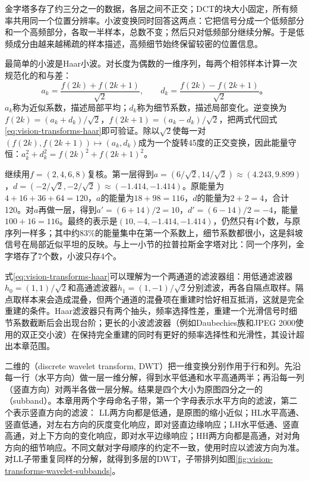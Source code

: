 金字塔多存了约三分之一的数据，各层之间不正交；DCT的块大小固定，所有频率共用同一个位置分辨率。小波变换同时回答这两点：它把信号分成一个低频部分和一个高频部分，各取一半样本，总数不变；然后只对低频部分继续分解。于是低频成分由越来越稀疏的样本描述，高频细节始终保留较密的位置信息。

最简单的小波是Haar小波。对长度为偶数的一维序列，每两个相邻样本计算一次规范化的和与差：
\begin{equation}
  a_k=\frac{f(2k)+f(2k+1)}{\sqrt2},\qquad
  d_k=\frac{f(2k)-f(2k+1)}{\sqrt2}\text{。}
  \label{eq:vision-transforms-haar}
\end{equation}
$a_k$称为近似系数，描述局部平均；$d_k$称为细节系数，描述局部变化。逆变换为$f(2k)=(a_k+d_k)/\sqrt2$，$f(2k+1)=(a_k-d_k)/\sqrt2$，把两式代回式\eqref{eq:vision-transforms-haar}即可验证。除以$\sqrt2$使每一对$(f(2k),f(2k+1))\mapsto(a_k,d_k)$成为一个旋转45度的正交变换，因此能量守恒：$a_k^2+d_k^2=f(2k)^2+f(2k+1)^2$。

继续用$f=(2,4,6,8)$复核。第一层得到$a=(6/\sqrt2,14/\sqrt2)\approx(4.243,9.899)$，$d=(-2/\sqrt2,-2/\sqrt2)\approx(-1.414,-1.414)$。原能量为$4+16+36+64=120$，$a$的能量为$18+98=116$，$d$的能量为$2+2=4$，合计120。对$a$再做一层，得到$a'=(6+14)/2=10$，$d'=(6-14)/2=-4$，能量$100+16=116$。最终的表示是$(10,-4,-1.414,-1.414)$，仍然只有4个数，与原序列一样多；其中约83\%的能量集中在第一个系数上，细节系数都很小，这是斜坡信号在局部近似平坦的反映。与上一小节的拉普拉斯金字塔对比：同一个序列，金字塔存了7个数，小波只存4个。

式\eqref{eq:vision-transforms-haar}可以理解为一个两通道的滤波器组：用低通滤波器$h_0=(1,1)/\sqrt2$和高通滤波器$h_1=(1,-1)/\sqrt2$分别滤波，再各自隔点取样。隔点取样本来会造成混叠，但两个通道的混叠项在重建时恰好相互抵消，这就是完全重建的条件。Haar滤波器只有两个抽头，频率选择性差，重建一个光滑信号时细节系数截断后会出现台阶；更长的小波滤波器（例如Daubechies族和JPEG 2000使用的双正交小波）在保持完全重建的同时有更好的频率选择性和光滑性，其设计超出本章范围。

二维的（discrete wavelet transform, DWT）把一维变换分别作用于行和列。先沿每一行（水平方向）做一层一维分解，得到水平低通和水平高通两半；再沿每一列（竖直方向）对两半各做一层分解。结果是四个大小为原图四分之一的（subband）。本章用两个字母命名子带，第一个字母表示水平方向的滤波，第二个表示竖直方向的滤波：
LL两方向都是低通，是原图的缩小近似；HL水平高通、竖直低通，对左右方向的灰度变化响应，即对竖直边缘响应；LH水平低通、竖直高通，对上下方向的变化响应，即对水平边缘响应；HH两方向都是高通，对对角方向的细节响应。不同文献对字母顺序的约定不一致，使用时应以滤波方向为准。对LL子带重复同样的分解，就得到多层的DWT，子带排列如图\ref{fig:vision-transforms-wavelet-subbands}。

